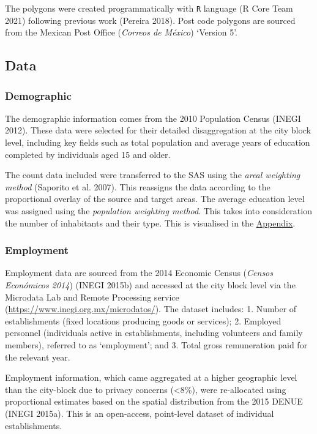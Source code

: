 \documentclass{article}
\begin{document}
The polygons were created programmatically with \texttt{R} language (R
Core Team 2021) following previous work (Pereira 2018). Post code
polygons are sourced from the Mexican Post Office (\emph{Correos de
México}) `Version 5'.

\subsection{Data}\label{data}

\subsubsection{Demographic}\label{demographic}

The demographic information comes from the 2010 Population Census (INEGI
2012). These data were selected for their detailed disaggregation at the
city block level, including key fields such as total population and
average years of education completed by individuals aged 15 and older.

The count data included were transferred to the SAS using the
\emph{areal weighting method} (Saporito et al. 2007). This reassigns the
data according to the proportional overlay of the source and target
areas. The average education level was assigned using the
\emph{population weighting method}. This takes into consideration the
number of inhabitants and their type. This is visualised in the
\hyperref[appendix]{Appendix}.

\subsubsection{Employment}\label{employment}

Employment data are sourced from the 2014 Economic Census (\emph{Censos
Económicos 2014}) (INEGI 2015b) and accessed at the city block level via
the Microdata Lab and Remote Processing service
(\url{https://www.inegi.org.mx/microdatos/}). The dataset includes: 1.
Number of establishments (fixed locations producing goods or services);
2. Employed personnel (individuals active in establishments, including
volunteers and family members), referred to as `employment'; and 3.
Total gross remuneration paid for the relevant year.

Employment information, which came aggregated at a higher geographic
level than the city-block due to privacy concerns (\textless8\%), were
re-allocated using proportional estimates based on the spatial
distribution from the 2015 DENUE (INEGI 2015a). This is an open-access,
point-level dataset of individual establishments.
\end{document}
